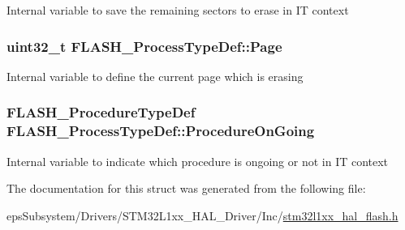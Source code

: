 Internal variable to save the remaining sectors to erase in I\-T context \hypertarget{struct_f_l_a_s_h___process_type_def_a36232ab2e05c69dc3a6804685a3b0e8c}{
\subsubsection[{Page}]{ uint32\-\_\-t F\-L\-A\-S\-H\-\_\-\-Process\-Type\-Def\-::\-Page}}\label{struct_f_l_a_s_h___process_type_def_a36232ab2e05c69dc3a6804685a3b0e8c}
Internal variable to define the current page which is erasing \hypertarget{struct_f_l_a_s_h___process_type_def_adcc5fdaba7d53dffdab0510a4dd7d179}{
\subsubsection[{Procedure\-On\-Going}]{ {\bf F\-L\-A\-S\-H\-\_\-\-Procedure\-Type\-Def} F\-L\-A\-S\-H\-\_\-\-Process\-Type\-Def\-::\-Procedure\-On\-Going}}\label{struct_f_l_a_s_h___process_type_def_adcc5fdaba7d53dffdab0510a4dd7d179}
Internal variable to indicate which procedure is ongoing or not in I\-T context 

The documentation for this struct was generated from the following file\-:\begin{DoxyCompactItemize}
\item 
eps\-Subsystem/\-Drivers/\-S\-T\-M32\-L1xx\-\_\-\-H\-A\-L\-\_\-\-Driver/\-Inc/\hyperlink{stm32l1xx__hal__flash_8h}{stm32l1xx\-\_\-hal\-\_\-flash.\-h}\end{DoxyCompactItemize}
